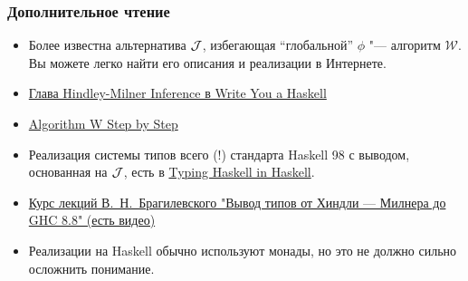 \documentclass[11pt]{beamer}
\begin{document}
\begin{frame}[fragile]
  \frametitle{Дополнительное чтение}
  \begin{itemize}
    \item Более известна альтернатива $\mathcal{J}$, избегающая \enquote{глобальной} $\phi$ "--- алгоритм $\mathcal{W}$. Вы можете легко найти его описания и реализации в Интернете.
    \item \href{http://dev.stephendiehl.com/fun/006_hindley_milner.html}{Глава Hindley-Milner Inference в Write You a Haskell}
    \item \href{http://citeseerx.ist.psu.edu/viewdoc/summary?doi=10.1.1.65.7733}{Algorithm W Step by Step}
    \item Реализация системы типов всего (!) стандарта Haskell 98 с выводом, основанная на $\mathcal{J}$, есть в \href{https://gist.github.com/chrisdone/0075a16b32bfd4f62b7b}{Typing Haskell in Haskell}.
    \item \href{https://compsciclub.ru/courses/types/2019-spring/classes/}{Курс лекций В.~Н.~Брагилевского "Вывод типов от Хиндли — Милнера до GHC 8.8"  (есть видео)}
    \item Реализации на Haskell обычно используют монады, но это не должно сильно осложнить понимание.
  \end{itemize}
\end{frame}
\end{document}
